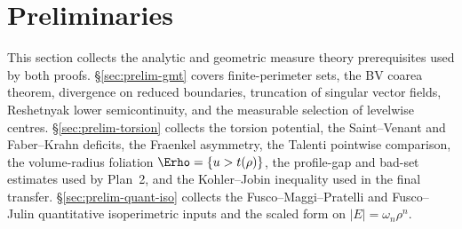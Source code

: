 %

\section{Preliminaries}
\label{sec:prelims}
\label{sec:notation}%

This section collects the analytic and geometric measure theory
prerequisites used by both proofs. \S\ref{sec:prelim-gmt} covers
finite-perimeter sets, the BV coarea theorem, divergence on reduced
boundaries, truncation of singular vector fields, Reshetnyak lower
semicontinuity, and the measurable selection of levelwise centres.
\S\ref{sec:prelim-torsion} collects the torsion potential, the
Saint--Venant and Faber--Krahn deficits, the Fraenkel asymmetry, the
Talenti pointwise comparison, the volume-radius foliation
$\Erho=\{u>t(\rho)\}$, the profile-gap and bad-set estimates used by
Plan~2, and the Kohler--Jobin inequality used in the final transfer.
\S\ref{sec:prelim-quant-iso} collects the Fusco--Maggi--Pratelli and
Fusco--Julin quantitative isoperimetric inputs and the scaled form
on $|E|=\omega_n\rho^n$.


\label{sec:gmt-velocity}%

\label{sec:torsion-preliminaries}%
\label{sec:preliminaries-torsion}%


